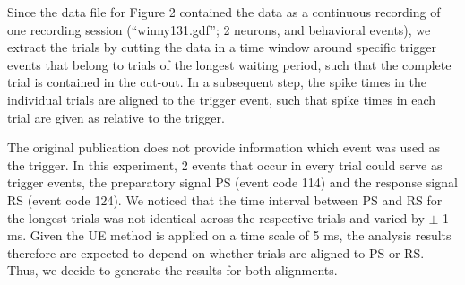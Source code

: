 \documentclass[10pt,a4paper,onecolumn]{article}
\begin{document}
Since the data file for Figure 2 contained the data as a continuous
recording of one recording session (``winny131.gdf''; 2 neurons, and
behavioral events), we extract the trials by cutting the data in a time
window around specific trigger events that belong to trials of the
longest waiting period, such that the complete trial is contained in the
cut-out. In a subsequent step, the spike times in the individual trials
are aligned to the trigger event, such that spike times in each trial
are given as relative to the trigger.

The original publication does not provide information which event was
used as the trigger. In this experiment, 2 events that occur in every
trial could serve as trigger events, the preparatory signal PS (event
code 114) and the response signal RS (event code 124). We noticed that
the time interval between PS and RS for the longest trials was not
identical across the respective trials and varied by \(\pm\) 1 ms. Given
the UE method is applied on a time scale of 5 ms, the analysis results
therefore are expected to depend on whether trials are aligned to PS or
RS. Thus, we decide to generate the results for both alignments.
\end{document}
